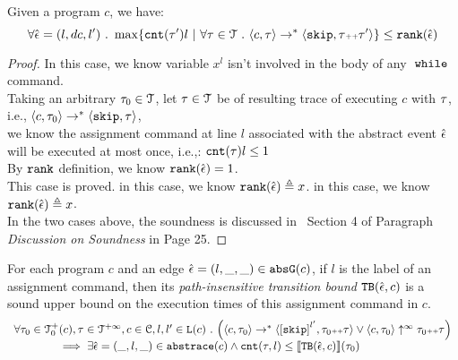   \begin{lem}
    \label{lem:local_bound_sound}
  Given a program ${c}$, we have:
  \[
  \forall \absevent = (l, dc, l') \st 
  \max \left\{ \counter(\vtrace') l ~ \middle\vert~
  \forall \vtrace \in \mathcal{T} \st \config{{c}, \trace} \to^{*} \config{\eskip, \trace\tracecat\vtrace'} \right\} 
  \leq 
  \locbound(\absevent)
  \]
  \end{lem}
  \begin{proof}
    In this case, we know variable $x^l$ isn't involved in the body of any $\;\mathtt{while}\;$ command. 
    \\
    Taking an arbitrary $\mathtt{\tau}_0 \in \mathcal{T}$, 
    let $\mathtt{\tau} \in \mathcal{T}$ be of resulting trace of executing $c$ with $\mathtt{\tau}$, 
    i.e., $\langle {c}, \mathtt{\tau}_0 \rangle \to^{*} \langle \mathtt{skip}, \mathtt{\tau} \rangle$,
    \\
    we know the
    assignment command at line $l$ associated with the abstract event $\hat{\mathtt{\epsilon}{}}$ will be executed at most once, i.e.,:
    $\mathtt{cnt}(\mathtt{\tau}) l \leq 1$
    \\
    By $\mathtt{rank}$ definition, we know $\mathtt{rank}(\hat{\mathtt{\epsilon}{}}) = 1$.
    \\
    This case is proved.
      in this case, we know $\mathtt{rank}(\hat{\mathtt{\epsilon}{}}) \triangleq x$.
      in this case, we know $\mathtt{rank}(\hat{\mathtt{\epsilon}{}}) \triangleq x$.
    \\
    In the two cases above, the soundness is discussed in~\cite{SinnZV17} Section 4 of Paragraph \emph{Discussion on Soundness} in Page 25.
  \end{proof}
  \begin{theorem}
  For each program ${c}$ and an edge $\hat{\mathtt{\epsilon}{}} = (l, \_, \_) \in \mathtt{abs}{\mathtt{G}}(c)$, if $l$ is the label of an assignment command,
  then its \emph{path-insensitive transition bound} ${\mathtt{TB}}(\hat{\mathtt{\epsilon}{}}, c)$ 
   is a sound upper bound on 
  the execution times of this assignment command in $c$.
    \[
      \begin{array}{l}
        \forall \trace_0 \in \ftdom_0(c), \trace \in \tdom, c \in \cdom, l, l' \in \lvar(c) \st
        \Big( \config{c, \trace_0} \rightarrow^{*} \config{\clabel{\eskip}^{l'}, \trace_0 \tracecat \trace} 
          \lor  \config{c, \trace_0} \uparrow^{\infty} \trace_0 \tracecat \trace \Big)
         \\ \qquad \qquad
         \implies
         \exists \absevent = (\_, l, \_) \in \absflow(c) \land
        \counter(\trace, l) \leq \econfig{\absclr(\absevent, c)}(\trace_0)
      \end{array}
    \]
  \end{theorem}
